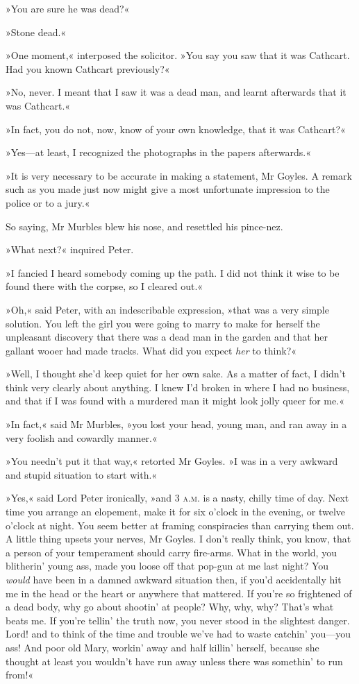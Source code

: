 »You are sure he was dead?«

»Stone dead.«

»One moment,« interposed the solicitor. »You say you saw that it was Cathcart. Had you known Cathcart previously?«

»No, never. I meant that I saw it was a dead man, and learnt afterwards that it was Cathcart.«

»In fact, you do not, now, know of your own knowledge, that it was Cathcart?«

»Yes—at least, I recognized the photographs in the papers afterwards.«

»It is very necessary to be accurate in making a statement, Mr Goyles.  A remark such as you made just now might give a most unfortunate impression to the police or to a jury.«

So saying, Mr Murbles blew his nose, and resettled his pince-nez.

»What next?« inquired Peter.

»I fancied I heard somebody coming up the path. I did not think it wise to be found there with the corpse, so I cleared out.«

»Oh,« said Peter, with an indescribable expression, »that was a very simple solution. You left the girl you were going to marry to make for herself the unpleasant discovery that there was a dead man in the garden and that her gallant wooer had made tracks. What did you expect \textit{her} to think?«

»Well, I thought she'd keep quiet for her own sake. As a matter of fact, I didn't think very clearly about anything. I knew I'd broken in where I had no business, and that if I was found with a murdered man it might look jolly queer for me.«

»In fact,« said Mr Murbles, »you lost your head, young man, and ran away in a very foolish and cowardly manner.«

»You needn't put it that way,« retorted Mr Goyles. »I was in a very awkward and stupid situation to start with.«

»Yes,« said Lord Peter ironically, »and 3 \textsc{a.m.} is a nasty, chilly time of day. Next time you arrange an elopement, make it for six o'clock in the evening, or twelve o'clock at night. You seem better at framing conspiracies than carrying them out. A little thing upsets your nerves, Mr Goyles. I don't really think, you know, that a person of your temperament should carry fire-arms. What in the world, you blitherin' young ass, made you loose off that pop-gun at me last night? You \textit{would} have been in a damned awkward situation then, if you'd accidentally hit me in the head or the heart or anywhere that mattered. If you're so frightened of a dead body, why go about shootin' at people? Why, why, why? That's what beats me. If you're tellin' the truth now, you never stood in the slightest danger. Lord! and to think of the time and trouble we've had to waste catchin' you—you ass! And poor old Mary, workin' away and half killin' herself, because she thought at least you wouldn't have run away unless there was somethin' to run from!«

